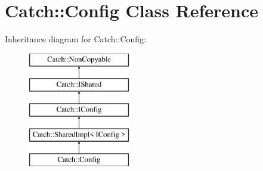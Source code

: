 \hypertarget{class_catch_1_1_config}{\section{Catch\-:\-:Config Class Reference}
\label{class_catch_1_1_config}
}
Inheritance diagram for Catch\-:\-:Config\-:\begin{figure}[H]
\begin{center}
\leavevmode
\includegraphics[height=5.000000cm]{class_catch_1_1_config}
\end{center}
\end{figure}
